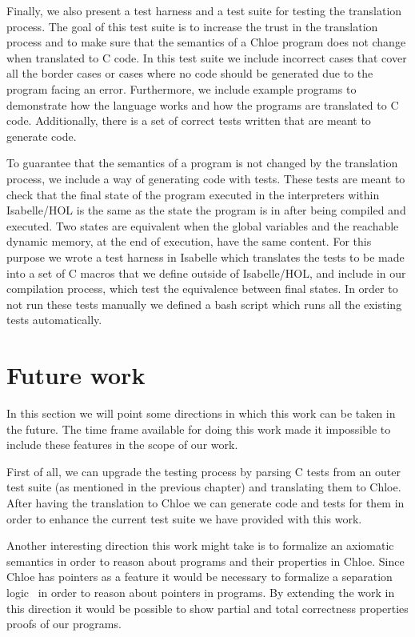 Finally, we also present a test harness and a test suite for testing the translation process.
The goal of this test suite is to increase the trust in the translation process and to make sure that the semantics of a Chloe program does not change when translated to C code.
In this test suite we include incorrect cases that cover all the border cases or cases where no code should be generated due to the program facing an error.
Furthermore, we include example programs to demonstrate how the language works and how the programs are translated to C code.
Additionally, there is a set of correct tests written that are meant to generate code.

To guarantee that the semantics of a program is not changed by the translation process, we include a way of generating code with tests.
These tests are meant to check that the final state of the program executed in the interpreters within Isabelle/HOL is the same as the state the program is in after being compiled and executed.
Two states are equivalent when the global variables and the reachable dynamic memory, at the end of execution, have the same content.
For this purpose we wrote a test harness in Isabelle which translates the tests to be made into a set of C macros that we define outside of Isabelle/HOL, and include in our compilation process, which test the equivalence between final states.
In order to not run these tests manually we defined a bash script which runs all the existing tests automatically.

\section{Future work}

In this section we will point some directions in which this work can be taken in the future.
The time frame available for doing this work made it impossible to include these features in the scope of our work.

First of all, we can upgrade the testing process by parsing C tests from an outer test suite (as mentioned in the previous chapter) and translating them to Chloe.
After having the translation to Chloe we can generate code and tests for them in order to enhance the current test suite we have provided with this work.

Another interesting direction this work might take is to formalize an axiomatic semantics in order to reason about programs and their properties in Chloe.
Since Chloe has pointers as a feature it would be necessary to formalize a separation logic~\parencite{sep-logic} in order to reason about pointers in programs.
By extending the work in this direction it would be possible to show partial and total correctness properties proofs of our programs.

